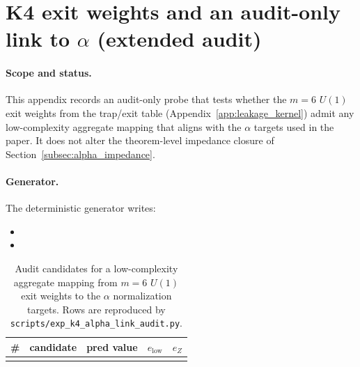 \section{K4 exit weights and an audit-only link to \texorpdfstring{$\alpha$}{alpha} (extended audit)}
\label{app:k4_alpha_link_audit}

\paragraph{Scope and status.}
\AuditTag This appendix records an audit-only probe that tests whether the $m=6$ $U(1)$ exit weights from the trap/exit table (Appendix~\ref{app:leakage_kernel}) admit any low-complexity aggregate mapping that aligns with the $\alpha$ targets used in the paper.
It does not alter the theorem-level impedance closure of Section~\ref{subsec:alpha_impedance}.

\paragraph{Generator.}
\AuditTag The deterministic generator  writes:
\begin{itemize}
\item {}
\item {}
\end{itemize}

\begin{table}[t]
\centering
\scriptsize
\setlength{\tabcolsep}{6pt}
\renewcommand{\arraystretch}{1.15}
\begin{tabular}{r l r r r}
\toprule
\# & candidate & pred value & $e_{\mathrm{low}}$ & $e_Z$ \\
\midrule
%
\\
\bottomrule
\end{tabular}
\caption{Audit candidates for a low-complexity aggregate mapping from $m=6$ $U(1)$ exit weights to the $\alpha$ normalization targets. Rows are reproduced by \texttt{scripts/exp\_k4\_alpha\_link\_audit.py}.}
\label{tab:k4_alpha_link_audit}
\end{table}

%

